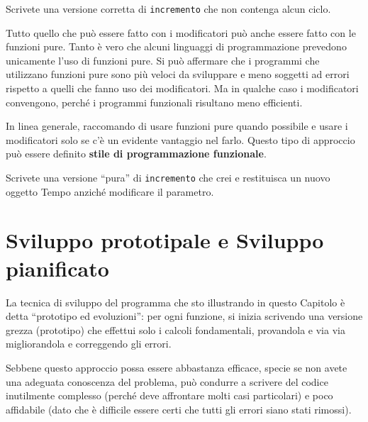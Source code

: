 \documentclass[10pt]{book}
\begin{document}
\vspace{0.2in}
\begin{exercise}

Scrivete una versione corretta di {\tt incremento} che non contenga alcun ciclo.

\end{exercise}

Tutto quello che può essere fatto con i modificatori può anche essere fatto con le funzioni pure. Tanto è vero che alcuni linguaggi di programmazione prevedono unicamente l'uso di funzioni pure. Si può affermare che i programmi che utilizzano funzioni pure sono più veloci da sviluppare e meno soggetti ad errori rispetto a quelli che fanno uso dei modificatori. Ma in qualche caso i modificatori convengono, perché i programmi funzionali risultano meno efficienti.

In linea generale, raccomando di usare funzioni pure quando possibile e usare i modificatori solo se c'è un evidente vantaggio nel farlo. Questo tipo di approccio può essere definito {\bf stile di programmazione funzionale}.

\vspace{0.2in}
\begin{exercise}

Scrivete una versione ``pura'' di {\tt incremento} che crei e restituisca un nuovo oggetto Tempo anziché modificare il parametro.

\end{exercise}


\section{Sviluppo prototipale e Sviluppo pianificato}
\label{prototype}

La tecnica di sviluppo del programma che sto illustrando in questo Capitolo è detta ``prototipo ed evoluzioni'': per ogni funzione, si inizia scrivendo una versione grezza (prototipo) che effettui solo i calcoli fondamentali, provandola e via via migliorandola e correggendo gli errori.

Sebbene questo approccio possa essere abbastanza efficace, specie se non avete una adeguata conoscenza del problema, può condurre a scrivere del codice inutilmente complesso (perché deve affrontare molti casi particolari) e poco affidabile (dato che è difficile essere certi che tutti gli errori siano stati rimossi).
\end{document}
